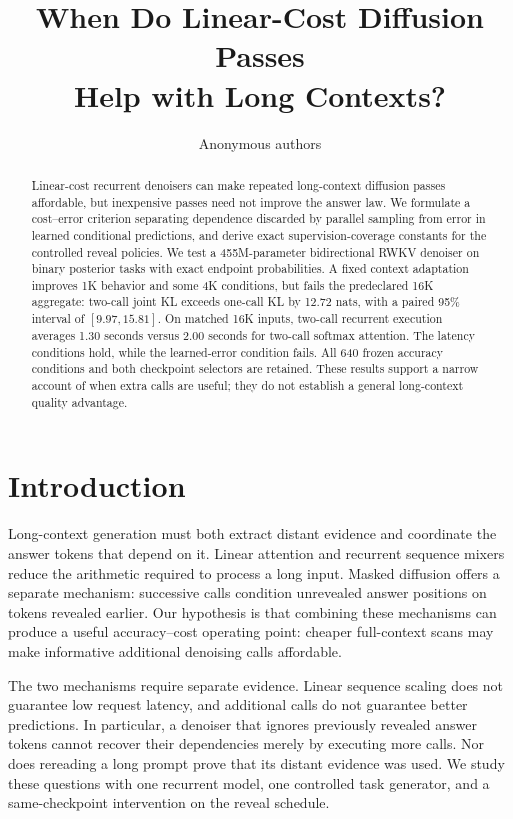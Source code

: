\documentclass{article}
\title{When Do Linear-Cost Diffusion Passes\\Help with Long Contexts?}
\author{Anonymous authors}
\begin{document}
\maketitle
\begin{abstract}
Linear-cost recurrent denoisers can make repeated long-context diffusion
passes affordable, but inexpensive passes need not improve the answer law.
We formulate a cost--error criterion separating dependence discarded by
parallel sampling from error in learned conditional predictions, and derive
exact supervision-coverage constants for the controlled reveal policies.
We test a 455M-parameter bidirectional RWKV denoiser on binary posterior tasks
with exact endpoint probabilities. A fixed context adaptation improves
1K behavior and some 4K conditions, but fails the predeclared 16K aggregate:
two-call joint KL exceeds one-call KL by 12.72 nats, with a paired 95\%
interval of $[9.97,15.81]$. On matched 16K inputs, two-call recurrent execution
averages 1.30 seconds versus 2.00 seconds for two-call softmax attention.
The latency conditions hold, while the learned-error condition fails.
All 640 frozen accuracy conditions and both checkpoint selectors are retained.
These results support a narrow account of when extra calls are useful;
they do not establish a general long-context quality advantage.
\end{abstract}

\section{Introduction}
Long-context generation must both extract distant evidence and coordinate the
answer tokens that depend on it. Linear attention and recurrent sequence mixers
reduce the arithmetic required to process a long input. Masked diffusion offers
a separate mechanism: successive calls condition unrevealed answer positions on
tokens revealed earlier. Our hypothesis is that combining these mechanisms can
produce a useful accuracy--cost operating point: cheaper full-context scans may
make informative additional denoising calls affordable.

The two mechanisms require separate evidence. Linear sequence scaling does not
guarantee low request latency, and additional calls do not guarantee better
predictions. In particular, a denoiser that ignores previously revealed answer
tokens cannot recover their dependencies merely by executing more calls. Nor
does rereading a long prompt prove that its distant evidence was used. We study
these questions with one recurrent model, one controlled task generator, and a
same-checkpoint intervention on the reveal schedule.
\end{document}

